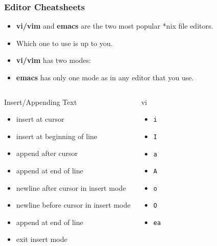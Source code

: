 \documentclass[slidestop,mathserif,compress,xcolor=svgnames]{beamer}
\newenvironment{eblock}[0]
{
\begin{beamerboxesrounded}[upper=uppercol2,lower=lowercol2,shadow=true]}
{\end{beamerboxesrounded}}
\begin{document}
\begin{frame}[allowframebreaks]
  \frametitle{\small Editor Cheatsheets}
  \begin{itemize}
    \item \textbf{vi/vim} and \textbf{emacs} are the two most popular *nix file editors.
    \item Which one to use is up to you.
    \item \textbf{vi/vim} has two modes:
    \item \textbf{emacs} has only one mode as in any editor that you use.
  \end{itemize}
  {\scriptsize
  \begin{columns}
    \vspace{-0.5cm}
    \begin{eblock}{Insert/Appending Text}
    \begin{itemize}
      \item insert at cursor 
      \item insert at beginning of line
      \item append after cursor
      \item append at end of line
      \item newline after cursor in insert mode
      \item newline before cursor in insert mode
      \item append at end of line
      \item exit insert mode
    \end{itemize}
    \end{eblock}
    \vspace{-0.5cm}
    \begin{eblock}{vi}
    \begin{itemize}
      \item \texttt{i}
      \item \texttt{I}
      \item \texttt{a}
      \item \texttt{A}
      \item \texttt{o}
      \item \texttt{O}
      \item \texttt{ea}

\end{itemize}
\end{eblock}
\end{columns}}
\end{frame}
\end{document}
